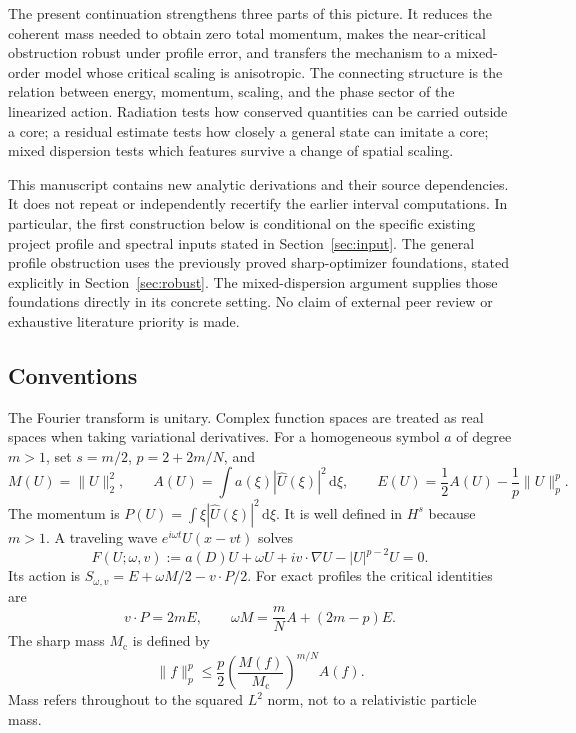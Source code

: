 \documentclass[11pt]{article}
\theoremstyle{definition}
\theoremstyle{remark}
\newcommand{\norm}[1]{\lVert #1\rVert}
\newcommand{\mc}{M_{\mathrm c}}
\newcommand{\dd}{\,\mathrm d}
\begin{document}
The present continuation strengthens three parts of this picture. It reduces the coherent mass needed to obtain zero total momentum, makes the near-critical obstruction robust under profile error, and transfers the mechanism to a mixed-order model whose critical scaling is anisotropic. The connecting structure is the relation between energy, momentum, scaling, and the phase sector of the linearized action. Radiation tests how conserved quantities can be carried outside a core; a residual estimate tests how closely a general state can imitate a core; mixed dispersion tests which features survive a change of spatial scaling.

This manuscript contains new analytic derivations and their source dependencies. It does not repeat or independently recertify the earlier interval computations. In particular, the first construction below is conditional on the specific existing project profile and spectral inputs stated in Section~\ref{sec:input}. The general profile obstruction uses the previously proved sharp-optimizer foundations, stated explicitly in Section~\ref{sec:robust}. The mixed-dispersion argument supplies those foundations directly in its concrete setting. No claim of external peer review or exhaustive literature priority is made.

\subsection{Conventions}

The Fourier transform is unitary. Complex function spaces are treated as real spaces when taking variational derivatives. For a homogeneous symbol $a$ of degree $m>1$, set $s=m/2$, $p=2+2m/N$, and
\begin{equation}\label{eq:generalcharges}
 M(U)=\norm{U}_2^2,\qquad
 A(U)=\int a(\xi)|\widehat U(\xi)|^2\dd\xi,\qquad
 E(U)=\frac12A(U)-\frac1p\norm{U}_p^p.
\end{equation}
The momentum is $P(U)=\int\xi|\widehat U(\xi)|^2\dd\xi$. It is well defined in $H^s$ because $m>1$. A traveling wave $e^{i\omega t}U(x-vt)$ solves
\begin{equation}\label{eq:generalprofile}
 F(U;\omega,v):=a(D)U+\omega U+iv\cdot\nabla U-|U|^{p-2}U=0.
\end{equation}
Its action is $S_{\omega,v}=E+\omega M/2-v\cdot P/2$. For exact profiles the critical identities are
\begin{equation}\label{eq:generalpohozaev}
 v\cdot P=2mE,\qquad
 \omega M=\frac mN A+(2m-p)E.
\end{equation}
The sharp mass $\mc$ is defined by
\begin{equation}\label{eq:sharpGN}
 \norm{f}_p^p\le\frac p2\left(\frac{M(f)}{\mc}\right)^{m/N}A(f).
\end{equation}
Mass refers throughout to the squared $L^2$ norm, not to a relativistic particle mass.
\end{document}
